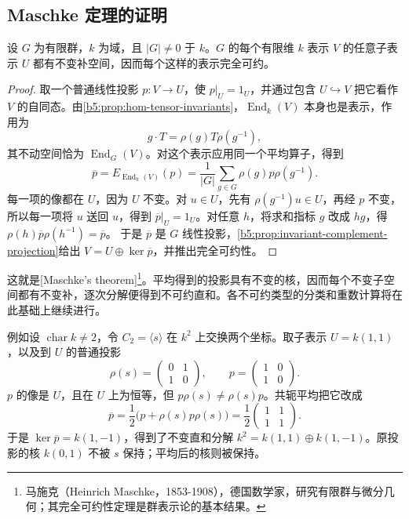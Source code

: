 \subsection{Maschke 定理的证明}
\label{b5:subsec:0103:02}

\begin{theorem}[Maschke]\label{b5:thm:maschke}
	设 \(G\) 为有限群，\(k\) 为域，且 \(|G|\ne0\) 于 \(k\)。\(G\) 的每个有限维 \(k\) 表示 \(V\) 的任意子表示 \(U\) 都有不变补空间，因而每个这样的表示完全可约。
\end{theorem}
\begin{proof}
	取一个普通线性投影 \(p:V\to U\)，使 \(p|_U=1_U\)，并通过包含 \(U\hookrightarrow V\) 把它看作 \(V\) 的自同态。由\cref{b5:prop:hom-tensor-invariants}，\(\operatorname{End}_k(V)\) 本身也是表示，作用为
	\[
		g\cdot T=\rho(g)T\rho(g^{-1}),
	\]
	其不动空间恰为 \(\operatorname{End}_G(V)\)。对这个表示应用同一个平均算子，得到
	\[
		\overline p=E_{\operatorname{End}_k(V)}(p) =\frac1{|G|}\sum_{g\in G}\rho(g)p\rho(g^{-1}).
	\]
	每一项的像都在 \(U\)，因为 \(U\) 不变。对 \(u\in U\)，先有 \(\rho(g^{-1})u\in U\)，再经 \(p\) 不变，所以每一项将 \(u\) 送回 \(u\)，得到 \(\overline p|_U=1_U\)。对任意 \(h\)，将求和指标 \(g\) 改成 \(hg\)，得 \(\rho(h)\overline p\rho(h^{-1})=\overline p\)。 于是 \(\overline p\) 是 \(G\) 线性投影，\cref{b5:prop:invariant-complement-projection}给出 \(V=U\oplus\ker\overline p\)，并推出完全可约性。
\end{proof}

这就是[Maschke's theorem]\footnote{马施克（Heinrich Maschke，1853-1908），德国数学家，研究有限群与微分几何；其完全可约性定理是群表示论的基本结果。}。平均得到的投影具有不变的核，因而每个不变子空间都有不变补，逐次分解便得到不可约直和。各不可约类型的分类和重数计算将在此基础上继续进行。

\ProseParagraphBreak
例如设 \(\operatorname{char}k\ne2\)，令 \(C_2=\langle s\rangle\) 在 \(k^2\) 上交换两个坐标。取子表示 \(U=k(1,1)\)，以及到 \(U\) 的普通投影
\[
	\rho(s)=\begin{pmatrix}0&1\\1&0\end{pmatrix},\qquad
	p=\begin{pmatrix}1&0\\1&0\end{pmatrix}.
\]
\(p\) 的像是 \(U\)，且在 \(U\) 上为恒等，但 \(p\rho(s)\ne\rho(s)p\)。共轭平均把它改成
\[
	\overline p=\dfrac12\bigl(p+\rho(s)p\rho(s)\bigr)
	=\dfrac12\begin{pmatrix}1&1\\1&1\end{pmatrix}.
\]
于是 \(\ker\overline p=k(1,-1)\)，得到了不变直和分解 \(k^2=k(1,1)\oplus k(1,-1)\)。原投影的核 \(k(0,1)\) 不被 \(s\) 保持；平均后的核则被保持。

